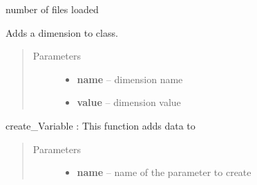 \documentclass[letterpaper,10pt,english]{sphinxmanual}
\begin{document}
\begin{fulllineitems}
\begin{fulllineitems}
\begin{quote}
\begin{description}
\end{description}\end{quote}

\end{fulllineitems}


\begin{fulllineitems}
\label{altimetry.data:altimetry.data.hydro_data.count}
number of files loaded

\end{fulllineitems}


\begin{fulllineitems}
\label{altimetry.data:altimetry.data.hydro_data.create_Dim}
Adds a dimension to class.
\begin{quote}\begin{description}
\item[{Parameters}] \leavevmode\begin{itemize}
\item {} 
\textbf{name} -- dimension name

\item {} 
\textbf{value} -- dimension value

\end{itemize}

\end{description}\end{quote}

\end{fulllineitems}


\begin{fulllineitems}
\label{altimetry.data:altimetry.data.hydro_data.create_Variable}
create\_Variable : This function adds data to {\hyperref[altimetry.data:altimetry.data.hydro_data]{}}
\begin{quote}\begin{description}
\item[{Parameters}] \leavevmode\begin{itemize}
\item {} 
\textbf{name} -- name of the parameter to create


\end{itemize}
\end{description}
\end{quote}
\end{fulllineitems}
\end{fulllineitems}
\end{document}
